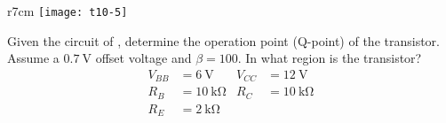 \documentclass[10pt,a4paper]{memoir}
\begin{document}
\newpage
\begin{question}
  \begin{wrapfigure}{r}{7cm}
    \centering
    \texttt{[image: t10-5]}
    \caption{}
    \label{fig:t10-5}
  \end{wrapfigure}
  Given the circuit of , determine the operation point (Q-point) of the transistor. Assume a $\SI{0.7}{\volt}$ offset voltage and $\beta = 100$. In what region is the transistor?
  \begin{align*}
    V_{BB} &= \SI{6}{\volt}      & V_{CC}  &= \SI{12}{\volt}     \\
    R_{B} &= \SI{10}{\kilo\ohm} & R_{C}   &= \SI{10}{\kilo\ohm} \\
    R_{E} &= \SI{2}{\kilo\ohm}  & 
  \end{align*}
  
\end{question}
\end{document}
